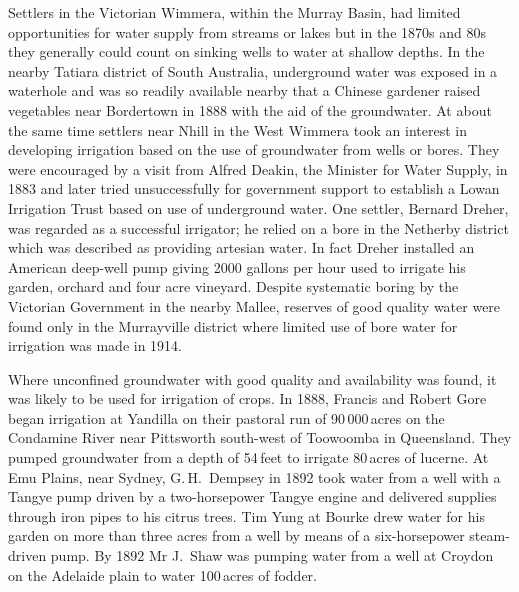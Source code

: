 Settlers in the Victorian Wimmera,  within the
Murray Basin, had limited opportunities for water supply from streams
or lakes but in the 1870s and 80s they generally could count on
sinking wells to water at shallow depths.  In the nearby Tatiara
district of South Australia, underground water was exposed in a
waterhole and was so readily available nearby that a Chinese gardener
raised vegetables near Bordertown  in 1888 with
the aid of the groundwater. At about the same time settlers near Nhill
in the West Wimmera took an interest in developing irrigation based on
the use of groundwater from wells or bores.  They were encouraged by a
visit from Alfred Deakin,  the Minister for Water
Supply, in 1883 and later tried unsuccessfully for government support
to establish a Lowan Irrigation Trust 
based on use of underground water.  One settler, Bernard Dreher,
  was regarded as a successful irrigator; he relied
on a bore in the Netherby district  which was
described as providing artesian water.  In fact Dreher installed an
American deep-well pump giving 2000 gallons per hour used to irrigate
his garden, orchard and four acre vineyard.  Despite systematic boring
by the Victorian Government in the nearby Mallee,
 reserves of good quality water were found only
in the Murrayville district where limited use of bore water for
irrigation was made in 1914.

Where unconfined groundwater with good quality and availability was
found, it was likely to be used for irrigation of crops.  In 1888,
Francis and Robert Gore  began irrigation at Yandilla
on their pastoral run of 90\,000\,acres on the Condamine River
 near Pittsworth 
south-west of Toowoomba in Queensland.  They pumped groundwater from a
depth of 54\,feet to irrigate 80\,acres of lucerne. At Emu Plains,
 near Sydney, G.\,H.~Dempsey  in 1892 took water from a well with a Tangye pump
 driven by a two-horsepower Tangye engine and delivered
supplies thr\-ough iron pipes to his citrus trees.  Tim Yung at Bourke
 drew water for his garden on more than three acres from
a well by means of a six-horsepower steam-driven pump. By 1892 Mr
J.~Shaw was pumping water from a well at Croydon 
on the Adelaide plain to water 100\,acres of
fodder.

